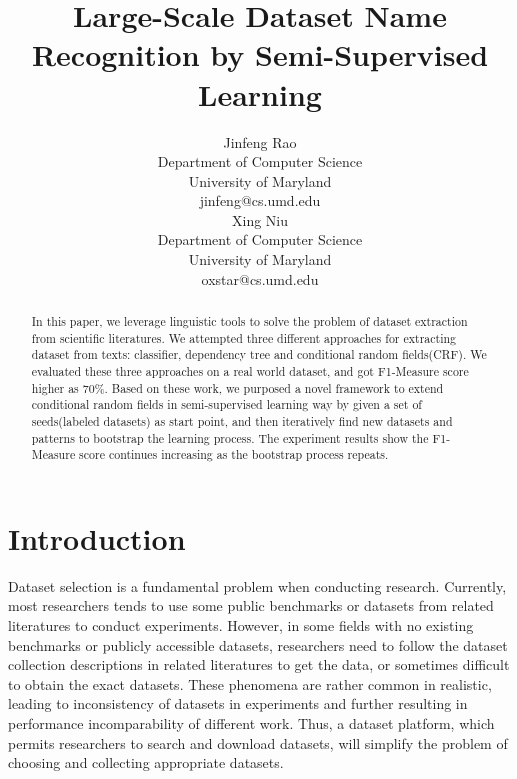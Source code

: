 \documentclass[10pt]{article}
\title{Large-Scale Dataset Name Recognition by Semi-Supervised Learning}
\author{Jinfeng Rao\\
  Department of Computer Science \\
  University of Maryland \\
  {jinfeng@cs.umd.edu} \\\And
  Xing Niu \\
  Department of Computer Science \\
  University of Maryland \\
  {oxstar@cs.umd.edu} \\}
\date{}
\begin{document}
\maketitle
\begin{abstract}
In this paper, we leverage linguistic tools to solve the problem of dataset extraction from scientific literatures. We attempted three different approaches for extracting dataset from texts: classifier, dependency tree and conditional random fields(CRF). We evaluated these three approaches on a real world dataset, and got F1-Measure score higher as 70\%. Based on these work, we purposed a novel framework to extend conditional random fields in semi-supervised learning way by given a set of seeds(labeled datasets) as start point, and then iteratively find new datasets and patterns to bootstrap the learning process. The experiment results show the F1-Measure score continues increasing as the bootstrap process repeats.  
\end{abstract}
\section{Introduction}
Dataset selection is a fundamental problem when conducting research. Currently, most researchers tends to use some public benchmarks or datasets from related literatures to conduct experiments. However, in some fields with no existing benchmarks or publicly accessible datasets, researchers need to follow the dataset collection descriptions in related literatures to get the data, or sometimes difficult to obtain the exact datasets. These phenomena are rather common in realistic, leading to inconsistency of datasets in experiments and further resulting in performance incomparability of different work. Thus, a dataset platform, which permits researchers to search and download datasets, will simplify the problem of choosing and collecting appropriate datasets.    
\end{document}
